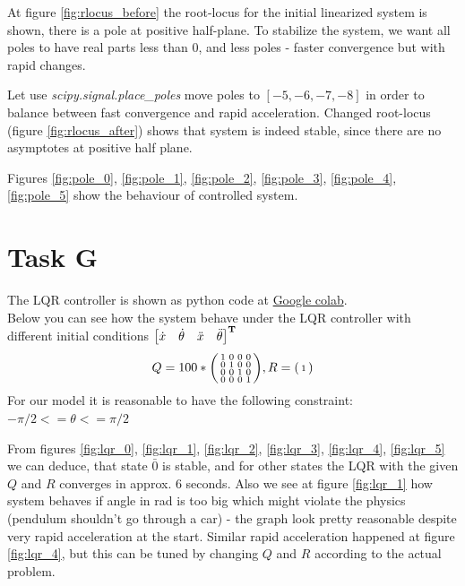 \documentclass[12pt,letterpaper]{article}
\begin{document}
        At figure \ref{fig:rlocus_before} the root-locus for the initial linearized system is shown, there is a pole at positive half-plane. To stabilize the system, we want all poles to have real parts less than 0, and less poles - faster convergence but with rapid changes.
        
        Let use \textit{scipy.signal.place\_poles} move poles to $[-5, -6, -7, -8]$ in order to balance between fast convergence and rapid acceleration. Changed root-locus (figure \ref{fig:rlocus_after}) shows that system is indeed stable, since there are no asymptotes at positive half plane.
        
        Figures \ref{fig:pole_0}, \ref{fig:pole_1}, \ref{fig:pole_2}, \ref{fig:pole_3}, \ref{fig:pole_4}, \ref{fig:pole_5} show the behaviour of controlled system.

\section*{Task G}
\label{Q:G}
    The LQR controller is shown as python code at \href{https://colab.research.google.com/drive/10-PsTk0fLdFx1oxj48kIPWLQ4z5LQphe}{Google colab}.\\
    Below you can see how the system behave under the LQR controller with different initial conditions $\begin{bmatrix}
            \dot x & \dot\theta & \ddot x & \ddot \theta 
        \end{bmatrix}^\mathbf{T}$
    \begin{equation*}
        Q = 100 * \smqty(\imat{4}), R =\smqty(\imat{1})
    \end{equation*}
    For our model it is reasonable to have the following constraint: $-\pi / 2 <= \theta <= \pi / 2 $
    
    From figures \ref{fig:lqr_0}, \ref{fig:lqr_1}, \ref{fig:lqr_2}, \ref{fig:lqr_3}, \ref{fig:lqr_4}, \ref{fig:lqr_5} we can deduce, that state $\bar 0$ is stable, and for other states the LQR with the given $Q$ and $R$ converges in approx. 6 seconds. Also we see at figure \ref{fig:lqr_1} how system behaves if angle in rad is too big which might violate the physics (pendulum shouldn't go through a car) - the graph look pretty reasonable despite very rapid acceleration at the start. Similar rapid acceleration happened at figure \ref{fig:lqr_4}, but this can be tuned by changing $Q$ and $R$ according to the actual problem.
        
\end{document}
